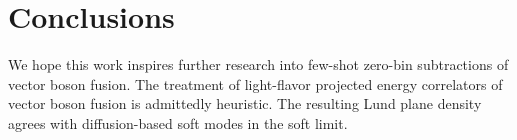 \section{Conclusions}\label{sec:conclusions}

We hope this work inspires further research into few-shot zero-bin
subtractions of vector boson fusion. The treatment of light-flavor
projected energy correlators of vector boson fusion is admittedly
heuristic. The resulting Lund plane density agrees with diffusion-based
soft modes in the soft limit.

